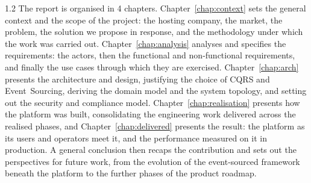 \begin{spacing}{1.2}
The report is organised in 4 chapters.
Chapter~\ref{chap:context} sets the general context and the scope of
the project: the hosting company, the market, the problem, the
solution we propose in response, and the methodology under which the
work was carried out. Chapter~\ref{chap:analysis} analyses and specifies the
requirements: the actors, then the functional
and non-functional requirements, and finally the use cases through which
they are exercised.
Chapter~\ref{chap:arch} presents the architecture and
design, justifying the choice of CQRS and Event~Sourcing,
deriving the domain model and the system topology, and setting out the
security and compliance model.
Chapter~\ref{chap:realisation} presents how the platform was built,
consolidating the engineering work delivered across the realised phases,
and Chapter~\ref{chap:delivered} presents the result: the platform as
its users and operators meet it, and the performance measured on it in
production. A general conclusion then recaps the contribution
and sets out the perspectives for future work, from the evolution of
the event-sourced framework beneath the platform to the further phases
of the product roadmap.

\end{spacing}
